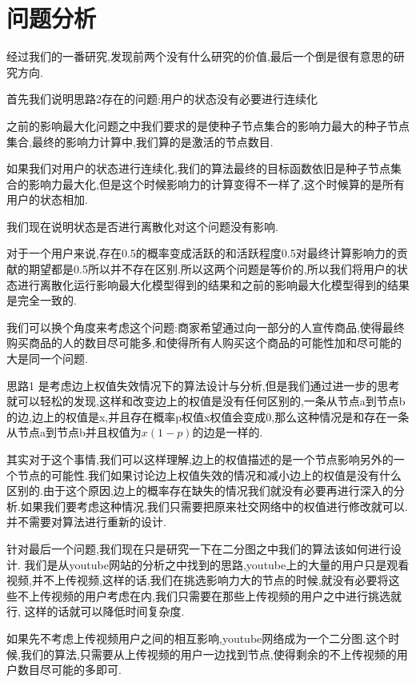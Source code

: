 \documentclass[11pt, a4paper]{article}
\begin{document}
  \section{问题分析}

  经过我们的一番研究,发现前两个没有什么研究的价值,最后一个倒是很有意思的研究方向.

  首先我们说明思路2存在的问题:用户的状态没有必要进行连续化

  之前的影响最大化问题之中我们要求的是使种子节点集合的影响力最大的种子节点集合,最终的影响力计算中,我们算的是激活的节点数目.

  如果我们对用户的状态进行连续化,我们的算法最终的目标函数依旧是种子节点集合的影响力最大化,但是这个时候影响力的计算变得不一样了,这个时候算的是所有用户的状态相加.

  我们现在说明状态是否进行离散化对这个问题没有影响.

  对于一个用户来说,存在0.5的概率变成活跃的和活跃程度0.5对最终计算影响力的贡献的期望都是0.5所以并不存在区别.所以这两个问题是等价的,所以我们将用户的状态进行离散化运行影响最大化模型得到的结果和之前的影响最大化模型得到的结果是完全一致的.

  我们可以换个角度来考虑这个问题:商家希望通过向一部分的人宣传商品,使得最终购买商品的人的数目尽可能多,和使得所有人购买这个商品的可能性加和尽可能的大是同一个问题.

  思路1 是考虑边上权值失效情况下的算法设计与分析,但是我们通过进一步的思考就可以轻松的发现,这样和改变边上的权值是没有任何区别的,一条从节点a到节点b的边,边上的权值是x,并且存在概率p权值x权值会变成0,那么这种情况是和存在一条从节点a到节点b并且权值为$x(1-p)$的边是一样的.

  其实对于这个事情,我们可以这样理解,边上的权值描述的是一个节点影响另外的一个节点的可能性.我们如果讨论边上权值失效的情况和减小边上的权值是没有什么区别的.由于这个原因,边上的概率存在缺失的情况我们就没有必要再进行深入的分析.如果我们要考虑这种情况,我们只需要把原来社交网络中的权值进行修改就可以.并不需要对算法进行重新的设计.

  针对最后一个问题,我们现在只是研究一下在二分图之中我们的算法该如何进行设计.
  我们是从youtube网站的分析之中找到的思路,youtube上的大量的用户只是观看视频,并不上传视频,这样的话,我们在挑选影响力大的节点的时候,就没有必要将这些不上传视频的用户考虑在内,我们只需要在那些上传视频的用户之中进行挑选就行, 这样的话就可以降低时间复杂度.

  如果先不考虑上传视频用户之间的相互影响,youtube网络成为一个二分图.这个时候,我们的算法,只需要从上传视频的用户一边找到节点,使得剩余的不上传视频的用户数目尽可能的多即可.
\end{document}
